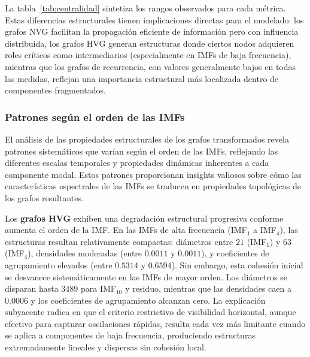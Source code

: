 \documentclass[11pt,a4paper]{article}
\begin{document}
La tabla~\ref{tab:centralidad} sintetiza los rangos observados para cada métrica. Estas diferencias estructurales tienen implicaciones directas para el modelado: los grafos NVG facilitan la propagación eficiente de información pero con influencia distribuida, los grafos HVG generan estructuras donde ciertos nodos adquieren roles críticos como intermediarios (especialmente en IMFs de baja frecuencia), mientras que los grafos de recurrencia, con valores generalmente bajos en todas las medidas, reflejan una importancia estructural más localizada dentro de componentes fragmentados.

\subsubsection{Patrones según el orden de las IMFs}

El análisis de las propiedades estructurales de los grafos transformados revela patrones sistemáticos que varían según el orden de las IMFs, reflejando las diferentes escalas temporales y propiedades dinámicas inherentes a cada componente modal. Estos patrones proporcionan insights valiosos sobre cómo las características espectrales de las IMFs se traducen en propiedades topológicas de los grafos resultantes.

Los \textbf{grafos HVG} exhiben una degradación estructural progresiva conforme aumenta el orden de la IMF. En las IMFs de alta frecuencia (IMF$_1$ a IMF$_4$), las estructuras resultan relativamente compactas: diámetros entre $21$ (IMF$_1$) y $63$ (IMF$_4$), densidades moderadas (entre $0.0011$ y $0.0011$), y coeficientes de agrupamiento elevados (entre $0.5314$ y $0.6594$). Sin embargo, esta cohesión inicial se desvanece sistemáticamente en las IMFs de mayor orden. Los diámetros se disparan hasta $3489$ para IMF$_{10}$ y residuo, mientras que las densidades caen a $0.0006$ y los coeficientes de agrupamiento alcanzan cero. La explicación subyacente radica en que el criterio restrictivo de visibilidad horizontal, aunque efectivo para capturar oscilaciones rápidas, resulta cada vez más limitante cuando se aplica a componentes de baja frecuencia, produciendo estructuras extremadamente lineales y dispersas sin cohesión local.
\end{document}
